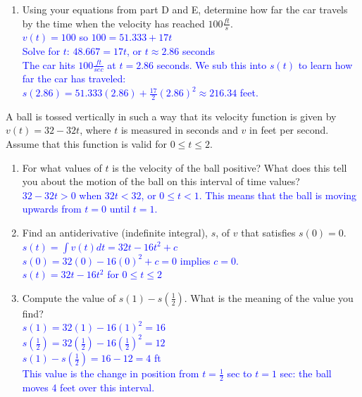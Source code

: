 \documentclass{ximera}
\begin{document}
\begin{exercise}
\begin{enumerate}
        \item[F.] Using your equations from part D and E, determine how far the car travels by the time when the velocity has reached $100\frac{ft}{s}$. \\
        \textcolor{blue}{ $v(t)=100$ so $100=51.333+17t$\\
        Solve for $t$: $48.667=17t$, or $t\approx 2.86$ seconds \\
        The car hits $100 \frac{ft}{sec}$ at $t=2.86$ seconds.  We sub this into $s(t)$ to learn how far the car has traveled:\\
        $s(2.86)=51.333(2.86)+\frac{17}{2}(2.86)^2\approx216.34$ feet.}\\
    \end{enumerate}
\end{exercise}
\begin{exercise}
    A ball is tossed vertically in such a way that its velocity function is given by $v(t)=32-32t$, where $t$ is measured in seconds and $v$ in feet per second. Assume that this function is valid for $0\leq t\leq2$.
    \begin{enumerate}
        \item[A.] For what values of $t$ is the velocity of the ball positive?  What does this tell you about the motion of the ball on this interval of time values? \\
        \textcolor{blue}{ $32-32t>0$ when $32t<32$, or $0\leq t<1$.  This means that the ball is moving upwards from $t=0$ until $t=1$.}\\

        \item[B.] Find an antiderivative (indefinite integral), $s$, of $v$ that satisfies $s(0)=0$.\\
        \textcolor{blue}{ $s(t)=\int v(t)dt=32t-16t^2+c$\\
        $s(0)=32(0)-16(0)^2+c=0$ implies $c=0$.\\
        $s(t)=32t-16t^2$ for $0\leq t\leq2$}\\

        \item[C.] Compute the value of $s(1)-s(\frac12)$.  What is the meaning of the value you find?\\
        \textcolor{blue}{ $s(1)=32(1)-16(1)^2=16$\\
        $s(\frac12)=32(\frac12)-16(\frac12)^2=12$\\
        $s(1)-s(\frac12)=16-12=4$ ft\\
        This value is the change in position from $t=\frac12$ sec to $t=1$ sec: the ball moves 4 feet over this interval.}


\end{enumerate}
\end{exercise}
\end{document}
